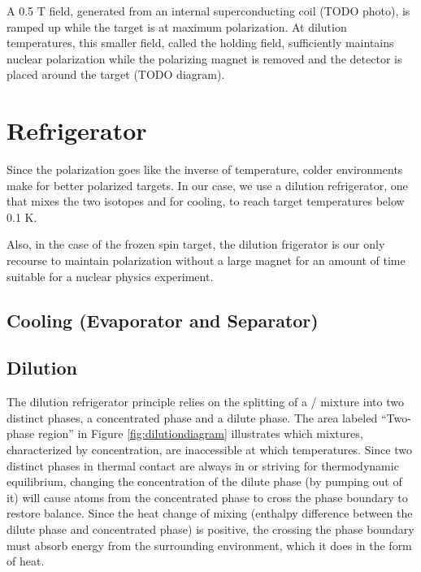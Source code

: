  
 A 0.5 T field, generated from an internal superconducting coil (TODO photo), is ramped up while the target is at maximum polarization.  At dilution temperatures, this smaller field, called the holding field, sufficiently maintains nuclear polarization while the polarizing magnet is removed and the detector is placed around the target (TODO diagram). 
 
 

\section{Refrigerator} 
Since the polarization goes like the inverse of temperature, colder environments make for better polarized targets.  In our case, we use a dilution refrigerator, one that mixes the two isotopes \het{} and \hef{} for cooling, to reach target temperatures below 0.1 K.


Also, in the case of the frozen spin target, the dilution frigerator is our only recourse to maintain polarization without a large magnet for an amount of time suitable for a nuclear physics experiment.

\subsection{\hef{}Cooling (Evaporator and Separator)}

\subsection{Dilution}

The dilution refrigerator principle relies on the splitting of a \het/\hef{} mixture into two distinct phases, a \het{} concentrated phase and a \het{} dilute phase.  The area labeled ``Two-phase region'' in Figure \ref{fig:dilutiondiagram} illustrates which mixtures, characterized by \het{} concentration, are inaccessible at which temperatures.  Since two distinct phases in thermal contact are always in or striving for thermodynamic equilibrium, changing the concentration of the dilute phase (by pumping \het{} out of it) will cause atoms from the concentrated phase to cross the phase boundary to restore balance.  Since the heat change of mixing (enthalpy difference between the dilute phase and concentrated phase) is positive, the \het{} crossing the phase boundary must absorb energy from the surrounding environment, which it does in the form of heat.\cite{hocktechniques}

